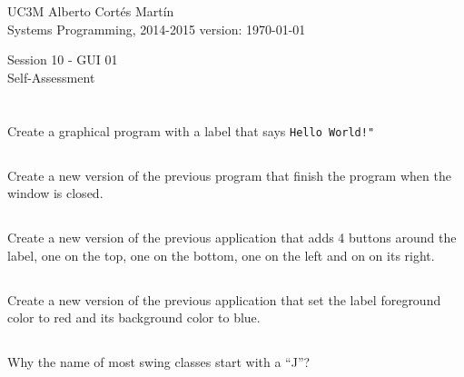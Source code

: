 \documentclass[a4paper, 11pt]{article}
\newcommand{\realtitle}{Session 10 - GUI 01}
\begin{document}
\makebox[\linewidth]{\rule{\textwidth}{0.4pt}}
UC3M \hfill Alberto Cortés Martín\\
Systems Programming, 2014-2015 \hfill version: \today\\
\makebox[\linewidth]{\rule{\textwidth}{0.4pt}}
\begin{center}
  \Large{\realtitle}\\Self-Assessment
\end{center}
\makebox[\linewidth]{\rule{\textwidth}{0.4pt}}
\vspace{1cm}

\section{}

\subsection{}

Create a graphical program with a label that says \verb+Hello World!"+


\subsection{}

Create a new version of the previous program that finish the program when the window is closed.


\subsection{}

Create a new version of the previous application that adds 4 buttons around the
label, one on the top, one on the bottom, one on the left and on on its right.

\subsection{}

Create a new version of the previous application that set the label foreground
color to red and its background color to blue.

\subsection{}

Why the name of most swing classes start with a ``J''?

\section{}
\end{document}

